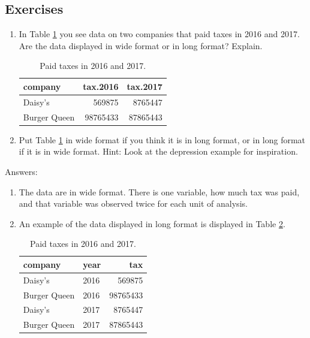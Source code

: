 \documentclass[]{report}\usepackage[]{graphicx}\usepackage[]{color}
\begin{document}
\subsection{Exercises}


\begin{enumerate}

\item In Table \ref{tab:taxes} you see data on two companies that paid taxes in 2016 and 2017. Are the data displayed in wide format or in long format? Explain.

\begin{table}[ht]
\centering
\caption{Paid taxes in 2016 and 2017.} 
\label{tab:taxes}
\begin{tabular}{lrr}
  \hline
company & tax.2016 & tax.2017 \\ 
  \hline
Daisy's & 569875 & 8765447 \\ 
  Burger Queen & 98765433 & 87865443 \\ 
   \hline
\end{tabular}
\end{table}


\item Put Table \ref{tab:taxes} in wide format if you think it is in long format, or in long format if it is in wide format. Hint: Look at the depression example for inspiration.



\end{enumerate}

Answers:

\begin{enumerate}

\item The data are in wide format. There is one variable, how much tax was paid, and that variable was observed twice for each unit of analysis.



\item An example of the data displayed in long format is displayed in Table \ref{tab:taxeslong}.

\begin{table}[ht]
\centering
\caption{Paid taxes in 2016 and 2017.} 
\label{tab:taxeslong}
\begin{tabular}{llr}
  \hline
company & year & tax \\ 
  \hline
Daisy's & 2016 & 569875 \\ 
  Burger Queen & 2016 & 98765433 \\ 
  Daisy's & 2017 & 8765447 \\ 
  Burger Queen & 2017 & 87865443 \\ 
   \hline
\end{tabular}
\end{table}


\end{enumerate}
\end{document}
